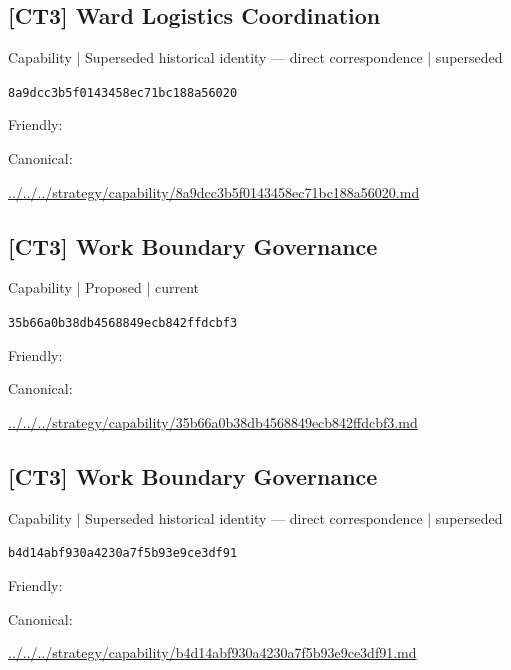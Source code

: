 \documentclass[10pt,a4paper]{article}
\begin{document}
\subsection*{[CT3] Ward Logistics Coordination}
{\small Capability | Superseded historical identity — direct correspondence | superseded}\par
\texttt{8a9dcc3b5f0143458ec71bc188a56020}\par
Friendly: \par
Canonical: \par
{\footnotesize\url{../../../strategy/capability/8a9dcc3b5f0143458ec71bc188a56020.md}}\par
\subsection*{[CT3] Work Boundary Governance}
{\small Capability | Proposed | current}\par
\texttt{35b66a0b38db4568849ecb842ffdcbf3}\par
Friendly: \par
Canonical: \par
{\footnotesize\url{../../../strategy/capability/35b66a0b38db4568849ecb842ffdcbf3.md}}\par
\subsection*{[CT3] Work Boundary Governance}
{\small Capability | Superseded historical identity — direct correspondence | superseded}\par
\texttt{b4d14abf930a4230a7f5b93e9ce3df91}\par
Friendly: \par
Canonical: \par
{\footnotesize\url{../../../strategy/capability/b4d14abf930a4230a7f5b93e9ce3df91.md}}\par
\end{document}
